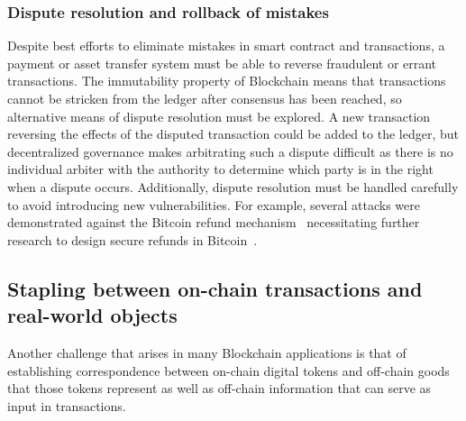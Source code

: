 \subsubsection{Dispute resolution and rollback of mistakes}
Despite best efforts to eliminate mistakes in smart contract and transactions, a payment or asset transfer system must be able to reverse fraudulent or errant transactions. The immutability property of Blockchain means that transactions cannot be stricken from the ledger after consensus has been reached, so alternative means of dispute resolution must be explored. A new transaction reversing the effects of the disputed transaction could be added to the ledger, but decentralized governance makes arbitrating such a dispute difficult as there is no individual arbiter with the authority to determine which party is in the right when a dispute occurs.  Additionally, dispute resolution must be handled carefully to avoid introducing new vulnerabilities.  For example, several attacks were demonstrated against the Bitcoin refund mechanism~\cite{FC:MccShaHao16} necessitating further research to design secure refunds in Bitcoin~\cite{arxiv:AviSafSha18}.


\subsection{Stapling between on-chain transactions and real-world objects}
Another challenge that arises in many Blockchain applications is that of establishing correspondence between on-chain digital tokens and off-chain goods that those tokens represent as well as off-chain information that can serve as input in transactions.  

